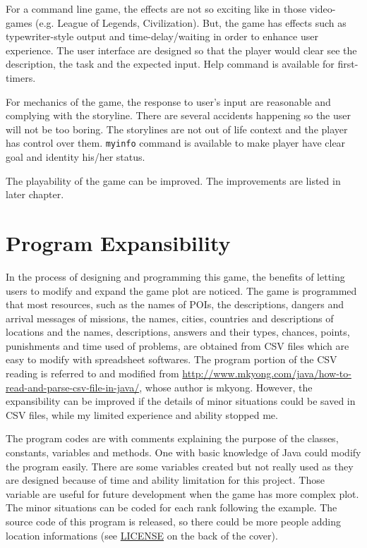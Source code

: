 \documentclass[letterpaper, 11pt]{report}
\begin{document}
For a command line game, the effects are not so exciting like in those video-games (e.g. League of Legends, Civilization). But, the game has effects such as typewriter-style output and time-delay/waiting in order to enhance user experience. The user interface are designed so that the player would clear see the description, the task and the expected input. Help command is available for first-timers.

For mechanics of the game, the response to user's input are reasonable and complying with the storyline. There are several accidents happening so the user will not be too boring. The storylines are not out of life context and the player has control over them. \texttt{myinfo} command is available to make player have clear goal and identity his/her status.

The playability of the game can be improved. The improvements are listed in later chapter.

\chapter{Program Expansibility}
In the process of designing and programming this game, the benefits of letting users to modify and expand the game plot are noticed. The game is programmed that most resources, such as the names of POIs, the descriptions, dangers and arrival messages of missions, the names, cities, countries and descriptions of locations and the names, descriptions, answers and their types, chances, points, punishments and time used of problems, are obtained from CSV files which are easy to modify with spreadsheet softwares. The program portion of the CSV reading is referred to and modified from \url{http://www.mkyong.com/java/how-to-read-and-parse-csv-file-in-java/}, whose author is mkyong. However, the expansibility can be improved if the details of minor situations could be saved in CSV files, while my limited experience and ability stopped me.

The program codes are with comments explaining the purpose of the classes, constants, variables and methods. One with basic knowledge of Java could modify the program easily. There are some variables created but not really used as they are designed because of time and ability limitation for this project. Those variable are useful for future development when the game has more complex plot. The minor situations can be coded for each rank following the example. The source code of this program is released, so there could be more people adding location informations (see \hyperref[chap:LICENSE]{LICENSE} on the back of the cover).
\end{document}
